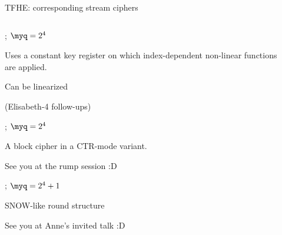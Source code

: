\documentclass[presentation,aspectratio=1610]{beamer}
\begin{document}
\begin{frame}{TFHE: corresponding stream ciphers}
  \begin{columns}
    \begin{column}{0.5\textwidth}
      \begin{description}
        \setlength\itemsep{0.3cm}
      \item<1->[Elisabeth-4] \cite{AC:CHMS22} ; $\myq = 2^4$

        {\small
        Uses a constant key register on which index-dependent non-linear functions are applied.

        Can be linearized~\cite{AC:GBJR23}}
                
    \item<2->[Gabriel...] \cite{INDOCRYPT:HofMeaSta23}

      {\small (Elisabeth-4 follow-ups)}

        
      \item<3->[FRAST] \cite{ToSC:CCHLOS24} ; $\myq = 2^4$
        {\small A block cipher in a CTR-mode variant.
        
        {\color{darkgreen}See you at the rump session :D}}

        
      \item<4->[Transistor] \cite{EPRINT:Transistor} ; $\myq = 2^4+1$

        {\small SNOW-like round structure

        {\color{darkgreen}See you at Anne's invited talk :D}}
      \end{description}
    \end{column}
    \hfill
    \begin{column}{0.45\textwidth}
    \end{column}
  \end{columns}
\end{frame}
\end{document}
